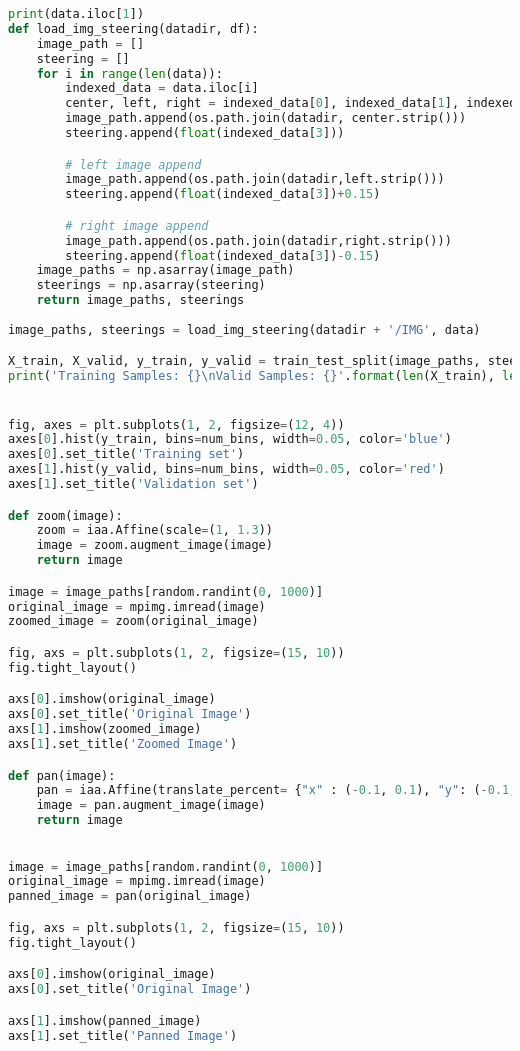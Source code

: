 \begin{lstlisting}[language=Python]
print(data.iloc[1])
def load_img_steering(datadir, df):
	image_path = []
	steering = []
	for i in range(len(data)):
		indexed_data = data.iloc[i]
		center, left, right = indexed_data[0], indexed_data[1], indexed_data[2]
		image_path.append(os.path.join(datadir, center.strip()))
		steering.append(float(indexed_data[3]))

		# left image append
		image_path.append(os.path.join(datadir,left.strip()))
		steering.append(float(indexed_data[3])+0.15)

		# right image append
		image_path.append(os.path.join(datadir,right.strip()))
		steering.append(float(indexed_data[3])-0.15)
	image_paths = np.asarray(image_path)
	steerings = np.asarray(steering)
	return image_paths, steerings
	
image_paths, steerings = load_img_steering(datadir + '/IMG', data)

X_train, X_valid, y_train, y_valid = train_test_split(image_paths, steerings, test_size=0.2, random_state=6)
print('Training Samples: {}\nValid Samples: {}'.format(len(X_train), len(X_valid)))


fig, axes = plt.subplots(1, 2, figsize=(12, 4))
axes[0].hist(y_train, bins=num_bins, width=0.05, color='blue')
axes[0].set_title('Training set')
axes[1].hist(y_valid, bins=num_bins, width=0.05, color='red')
axes[1].set_title('Validation set')

def zoom(image):
	zoom = iaa.Affine(scale=(1, 1.3))
	image = zoom.augment_image(image)
	return image

image = image_paths[random.randint(0, 1000)]
original_image = mpimg.imread(image)
zoomed_image = zoom(original_image)

fig, axs = plt.subplots(1, 2, figsize=(15, 10))
fig.tight_layout()

axs[0].imshow(original_image)
axs[0].set_title('Original Image')
axs[1].imshow(zoomed_image)
axs[1].set_title('Zoomed Image')

def pan(image):
	pan = iaa.Affine(translate_percent= {"x" : (-0.1, 0.1), "y": (-0.1, 0.1)})
	image = pan.augment_image(image)
	return image
	

image = image_paths[random.randint(0, 1000)]
original_image = mpimg.imread(image)
panned_image = pan(original_image)

fig, axs = plt.subplots(1, 2, figsize=(15, 10))
fig.tight_layout()

axs[0].imshow(original_image)
axs[0].set_title('Original Image')

axs[1].imshow(panned_image)
axs[1].set_title('Panned Image')



\end{lstlisting}
